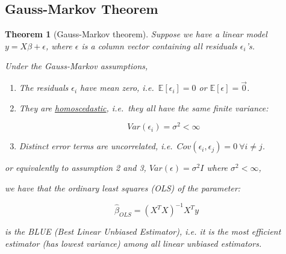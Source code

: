 \documentclass[12pt,a4paper]{article}
\newtheorem{theorem}{Theorem}
\begin{document}
\subsection{Gauss-Markov Theorem}\label{gauss-markov-thm}
\begin{theorem}[Gauss-Markov theorem]

Suppose we have a linear model \(y=X\beta+\epsilon\), where \(\epsilon\)
is a column vector containing all residuals \(\epsilon_i\)'s.

Under the Gauss-Markov assumptions,

\begin{enumerate}
\def\labelenumi{\arabic{enumi}.}
\item
  \label{assumption1}The residuals \(\epsilon_i\) have mean zero,
  i.e.~\(\mathbb{E}[\epsilon_i]=0\) or \(\mathbb{E}[\epsilon]=\vec{0}\).
\item
  They are
  \href{https://en.wikipedia.org/wiki/Homoscedasticity}{homoscedastic},
  i.e.~they all have the same finite variance:

  \[Var(\epsilon_i)=\sigma^2<\infty\]
\item
  Distinct error terms are uncorrelated,
  i.e.~\(Cov(\epsilon_i, \epsilon_j)=0\ \forall i\neq j\).
\end{enumerate}

or equivalently to assumption 2 and 3, \(Var(\epsilon) =\sigma^2I\)
where \(\sigma^2<\infty\),

we have that the ordinary least squares (OLS) of the parameter:

\[\hat\beta_{OLS}=(X^TX)^{-1}X^Ty\]

is the BLUE (Best Linear Unbiased Estimator), i.e. it is the most
efficient estimator (has lowest variance) among all linear unbiased estimators.

\end{theorem}
\bigskip
\end{document}
